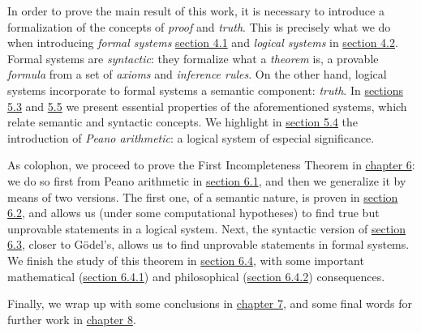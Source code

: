 In order to prove the main result of this work, it is necessary to introduce a formalization of the concepts of \emph{proof} and \emph{truth}. This is precisely what we do when introducing \emph{formal systems} \hyperref[sec:sistemas-formales]{section 4.1} and \emph{logical systems} in \hyperref[sec:sistemas-logicos]{section 4.2}. Formal systems are \emph{syntactic}: they formalize what a \emph{theorem} is, a provable \emph{formula} from a set of \emph{axioms} and \emph{inference rules}. On the other hand, logical systems incorporate to formal systems a semantic component: \emph{truth}. In \hyperref[sec:solidez-completitud-decidibilidad]{sections 5.3} and \hyperref[sec:consistencia]{5.5} we present essential properties of the aforementioned systems, which relate semantic and syntactic concepts. We highlight in \hyperref[sec:aritmetica-peano]{section 5.4} the introduction of \emph{Peano arithmetic}: a logical system of especial significance.

As colophon, we proceed to prove the First Incompleteness Theorem in \hyperref[ch:teorema-incompletitud]{chapter 6}: we do so first from Peano arithmetic in \hyperref[sec:primera-aproximacion]{section 6.1}, and then we generalize it by means of two versions. The first one, of a semantic nature, is proven in \hyperref[sec:version-semantica]{section 6.2}, and allows us (under some computational hypotheses) to find true but unprovable statements in a logical system. Next, the syntactic version of \hyperref[sec:version-sintactica]{section 6.3}, closer to Gödel's, allows us to find unprovable statements in formal systems. We finish the study of this theorem in \hyperref[sec:consecuencias]{section 6.4}, with some important mathematical (\hyperref[subsec:segundo-problema-hilbert]{section 6.4.1}) and philosophical (\hyperref[subsec:mente-humana-tesis-church-turing]{section 6.4.2}) consequences.

Finally, we wrap up with some conclusions in \hyperref[ch:conclusiones]{chapter 7}, and some final words for further work in \hyperref[ch:trabajo-futuro]{chapter 8}.

\begin{sidewaysfigure}
\centering

\end{sidewaysfigure}


%


\endinput

